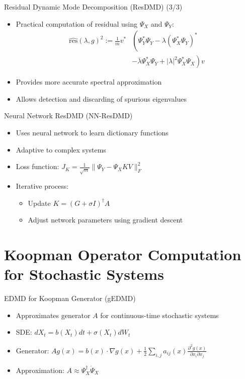 \documentclass{beamer}
\begin{document}
	\begin{frame}{Residual Dynamic Mode Decomposition (ResDMD) (3/3)}
		\begin{itemize}
			\item Practical computation of residual using $\Psi_X$ and $\Psi_Y$:
			\begin{align*}
				\widehat{\text{res}}(\lambda, g)^2 := \frac{1}{m} v^* & \left( \Psi_Y^* \Psi_Y - \lambda (\Psi_X^* \Psi_Y)^* \right. \\
				& \left. - \overline{\lambda} \Psi_X^* \Psi_Y + |\lambda|^2 \Psi_X^* \Psi_X \right) v
			\end{align*}
			\item Provides more accurate spectral approximation
			\item Allows detection and discarding of spurious eigenvalues
		\end{itemize}
	\end{frame}
	
	\begin{frame}{Neural Network ResDMD (NN-ResDMD)}
		\begin{itemize}
			\item Uses neural network to learn dictionary functions
			\item Adaptive to complex systems
			\item Loss function: $J_K = \frac{1}{\sqrt{m}} \|\Psi_Y - \Psi_X KV\|_F^2$
			\item Iterative process:
			\begin{itemize}
				\item Update $K = (G + \sigma I)^\dagger A$
				\item Adjust network parameters using gradient descent
			\end{itemize}
		\end{itemize}
	\end{frame}
	
	\section{Koopman Operator Computation for Stochastic Systems}
	
	\begin{frame}{EDMD for Koopman Generator (gEDMD)}
		\begin{itemize}
			\item Approximates generator $A$ for continuous-time stochastic systems
			\item SDE: $dX_t = b(X_t)dt + \sigma(X_t)dW_t$
			\item Generator: $Ag(x) = b(x) \cdot \nabla g(x) + \frac{1}{2}\sum_{i,j} a_{ij}(x) \frac{\partial^2g(x)}{\partial x_i \partial x_j}$
			\item Approximation: $A \approx \Psi_X^\dagger \dot{\Psi}_X$
		\end{itemize}
	\end{frame}
	
\end{document}
